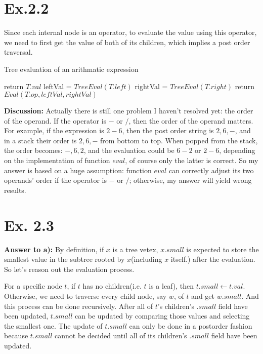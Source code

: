 \documentclass[a4paper,11pt]{article}
\theoremstyle{mytheor}
\begin{document}
\vspace{1.2in}

\section*{Ex.2.2}
Since each internal node is an operator, to evaluate the value using this operator, we need to first get the value of both of its children, which implies a post order traversal.

\begin{algorithm}[H]
\caption{Tree evaluation of an arithmatic expression}\label{TREEEVALUATION_2_2}
\begin{algorithmic}[1]
    \State return $T.val$
  \EndIf
  \State leftVal = $TreeEval(T.left)$
  \State rightVal = $TreeEval(T.right)$
  \State return $Eval(T.op, leftVal, rightVal)$
\EndFunction
\end{algorithmic}
\end{algorithm}
\noindent\textbf{Discussion:} Actually there is still one problem I haven't resolved yet: the order of the operand. If the operator is $-$ or $/$, then the order of the operand matters. For example, if the expression is $2-6$, then the post order string is $2, 6, -$, and in a stack their order is $2,6,-$ from bottom to top. When popped from the stack, the order becomes: $-, 6, 2$, and the evaluation could be $6-2$ or $2-6$, depending on the implementation of function $eval$, of course only the latter is correct. So my answer is based on a huge assumption: function $eval$ can correctly adjust its two operands' order if the operator is $-$ or $/$; otherwise, my answer will yield wrong results.

\vspace{1.2in}

\section*{Ex. 2.3}
\noindent\textbf{Answer to a):} By definition, if $x$ is a tree vetex, $x.small$ is expected to store the smallest value in the subtree rooted by $x$(including $x$ itself.) after the evaluation. So let's reason out the evaluation process.

For a specific node $t$, if $t$ has no children(i.e. $t$ is a leaf), then $t.small \gets t.val$. Otherwise, we need to traverse every child node, say $w$, of $t$ and get $w.small$. And this process can be done recursively. After all of $t$'s children's $.small$ field have been updated, $t.small$ can be updated by comparing those values and selecting the smallest one. The update of $t.small$ can only be done in a postorder fashion because $t.small$ cannot be decided until all of its children's $.small$ field have been updated.
\end{document}
